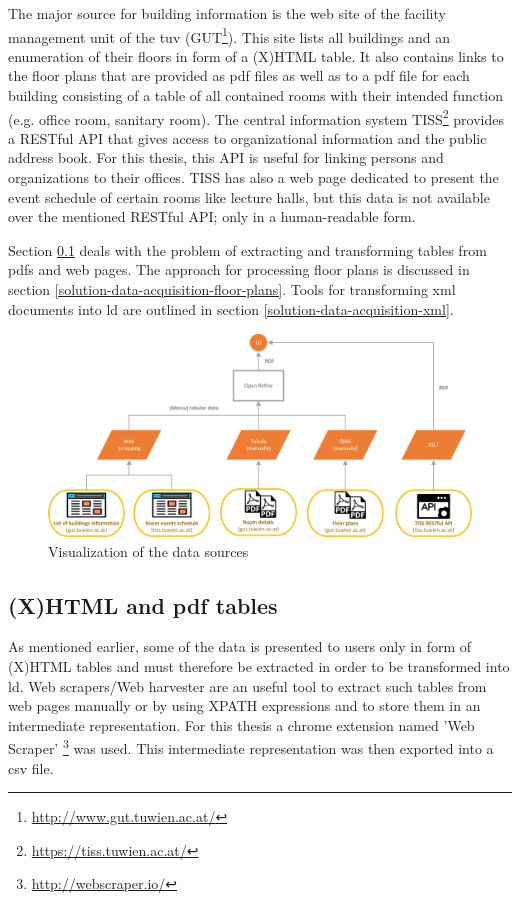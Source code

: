 \documentclass[draft,final]{vutinfth} %
\begin{document}
The major source for building information is the web site of the facility management unit of the \gls{tuv} (GUT\footnote{\url{http://www.gut.tuwien.ac.at/}}). This site lists all buildings and an enumeration of their floors in form of a (X)HTML table. It also contains links to the floor plans that are provided as \gls{pdf} files as well as to a \gls{pdf} file for each building consisting of a table of all contained rooms with their intended function (e.g. office room, sanitary room). The central information system TISS\footnote{\url{https://tiss.tuwien.ac.at/}} provides a RESTful API that gives access to organizational information and the public address book. For this thesis, this API is useful for linking persons and organizations to their offices. TISS has also a web page dedicated to present the event schedule of certain rooms like lecture halls, but this data is not available over the mentioned RESTful API; only in a human-readable form.

Section \ref{solution-data-acquisition-tables} deals with the problem of extracting and transforming tables from \gls{pdf}s and web pages. The approach for processing floor plans is discussed in section \ref{solution-data-acquisition-floor-plans}. Tools for transforming \gls{xml} documents into \gls{ld} are outlined in section \ref{solution-data-acquisition-xml}.

\begin{figure}[h]
    \centering
    \includegraphics[width=1.0\textwidth]{graphics/dataAcquisitionSources.png}
    \caption{Visualization of the data sources}
    \label{fig:solution-data-acquisition:sources}
\end{figure}

\subsection{(X)HTML and \gls{pdf} tables}
\label{solution-data-acquisition-tables}
As mentioned earlier, some of the data is presented to users only in form of (X)HTML tables and must therefore be extracted in order to be transformed into \gls{ld}. Web scrapers/Web harvester are an useful tool to extract such tables from web pages manually or by using XPATH expressions and to store them in an intermediate representation. For this thesis a chrome extension named 'Web Scraper' \footnote{\url{http://webscraper.io/}} was used. This intermediate representation was then exported into a \gls{csv} file. 
\end{document}
